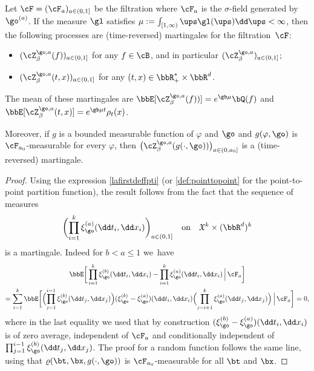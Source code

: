 \begin{lemma}
\label{lem:martingale}
Let $\cF = (\cF_a)_{a \in (0,1]}$ be the filtration where $\cF_a$ is the $\sigma$-field generated by~$\go^{(a)}$.
If the measure $\gl$ satisfies $\mu:=\int_{[1,\infty)} \ups \gl(\ups)\dd \ups<\infty$, then the following processes
are (time-reversed) martingales for the filtration~$\cF$:
\begin{itemize}
\item $(\cZ^{\go,a}_{\beta}(f))_{a\in (0,1]}$ for any $f\in \cB$, and in particular $(\cZ^{\go,a}_{\beta})_{a\in(0,1]}$;
\item $(\cZ^{\go,a}_{\beta}(t,x))_{a\in (0,1]}$ for any $(t,x)\in \bbR_+^*\times \bbR^d$.
\end{itemize}
The mean of these martingales are $\bbE[\cZ^{\go,a}_{\beta}(f))] =e^{\gb \mu} \bQ(f)$
and $\bbE[ \cZ^{\go,a}_{\beta} (t,x)]= e^{\gb \mu t}\rho_t(x)$.

Moreover, if $g$ is a bounded measurable function
of $\varphi$ and $\go$ and $g(\varphi,\go)$ is $\cF_{a_0}$\nobreakdash-mea\-sur\-able for every $\varphi$,
then $\bigl(\cZ^{\go,a}_{\beta}(g(\cdot, \go))\bigr)_{a\in(0,a_0]}$
is a (time-reversed) martingale.
\end{lemma}

\begin{proof}
Using the expression \eqref{lafirstdeffpti}
(or \eqref{def:pointtopoint} for the point-to-point partition function), the result follows from the fact that the sequence of measures
\[
\biggl(\prod_{i=1}^k\xi_{\go}^{(a)} (\dd t_i, \dd x_i) \biggr)_{a\in (0,1]}\quad\text{on}\quad \mathfrak{X}^k \times (\bbR^d)^k
\]
is a martingale.
Indeed
for $b< a\leq 1$ we~have\vspace*{-5pt}
\begin{multline*}
\bbE \bigg[ \prod_{i=1}^k\xi_{\go}^{(b)} (\dd t_i, \dd x_i)-\prod_{i=1}^k\xi_{\go}^{(a)} (\dd t_i, \dd x_i) \,\Big|\, \cF_a \bigg]\\
= \sum_{i=1}^k \bbE \bigg[ \Bigl(\prod_{j=1}^{i-1}\xi_{\go}^{(b)} (\dd t_j, \dd x_j) \Bigr)(\xi_{\go}^{(b)}-\xi_{\go}^{(a)})(\dd t_i, \dd x_i)
\Bigl(\prod_{j=i+1}^{k}\xi_{\go}^{(a)} (\dd t_j, \dd x_j) \Bigr) \,\Big|\, \cF_a \bigg]=0,
\end{multline*}
where in the last equality we used that by construction $(\xi_{\go}^{(b)}-\xi_{\go}^{(a)})(\dd t_i, \dd x_i)$ is of zero average, independent of $\cF_a$ and conditionally independent of
$\prod_{j=1}^{i-1}\xi_{\go}^{(b)} (\dd t_j, \dd x_j)$.
The proof for
a random function follows the same line, using that
$\varrho(\bt,\bx,g(\cdot, \go))$ is $\cF_{a_0}$\nobreakdash-mea\-sur\-able for all $\bt$ and $\bx$.
\end{proof}


